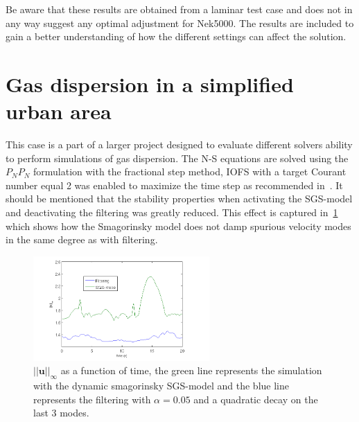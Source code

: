 Be aware that these results are obtained from a laminar test case and does not in any way 
suggest any optimal adjustment for Nek5000. The results are included to gain a better understanding
of how the different settings can affect the solution.

\section{Gas dispersion in a simplified urban area} 
This case is a part of a larger project designed to evaluate different solvers 
ability to perform simulations of gas dispersion. The N-S equations are solved using
the $P_NP_N$ formulation with the fractional step method, IOFS with a target Courant number 
equal 2 was enabled to maximize the time step as recommended in~\cite{Nek}. It should be 
mentioned that the stability properties when activating the SGS-model and deactivating the 
filtering was greatly reduced. This effect is captured in~\ref{fig:maxvel} which shows how 
the Smagorinsky model does not damp spurious velocity modes in the same degree as with filtering. 
%
\begin{figure}[h]
	\centering
	\includegraphics[width=0.6\textwidth]{Figures/maxvel.png}
    \caption{$||\mathbf{u}||_{\infty}$ as a function of time, the green line represents the 
simulation with the dynamic smagorinsky SGS-model and the blue line represents the filtering 
with $\alpha = 0.05$ and a quadratic decay on the last 3 modes.}
	\label{fig:maxvel}
\end{figure}
%
%
%
%
%

